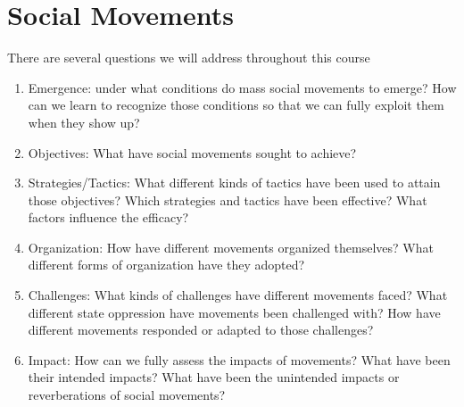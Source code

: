 \section{Social Movements}
There are several questions we will address throughout this course

\begin{enumerate}
    \item Emergence: under what conditions do mass social movements to emerge?
    How can we learn to recognize those conditions so that we can fully exploit them when they show up?
    \item Objectives:
    What have social movements sought to achieve?
    \item Strategies/Tactics: What different kinds of tactics have been used to attain those objectives? 
    Which strategies and tactics have been effective?
    What factors influence the efficacy?
    \item Organization:
    How have different movements organized themselves?
    What different forms of organization have they adopted?
    \item Challenges:
    What kinds of challenges have different movements faced?
    What different state oppression have movements been challenged with?
    How have different movements responded or adapted to those challenges?
    \item Impact:
    How can we fully assess the impacts of movements?
    What have been their intended impacts?
    What have been the unintended impacts or reverberations of social movements?
\end{enumerate}

